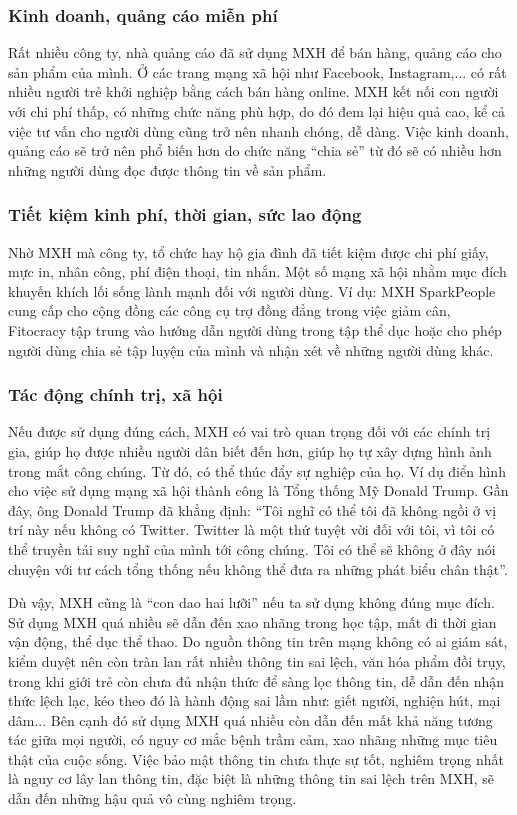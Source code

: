 		\subsubsection{Kinh doanh, quảng cáo miễn phí}
		Rất nhiều công ty, nhà quảng cáo đã sử dụng MXH để bán hàng, quảng cáo cho sản phẩm của mình. Ở các trang mạng xã hội như Facebook, Instagram,... có rất nhiều người trẻ khởi nghiệp bằng cách bán hàng online. MXH kết nối con người với chi phí thấp, có những chức năng phù hợp, do đó đem lại hiệu quả cao, kể cả việc tư vấn cho người dùng cũng trở nên nhanh chóng, dễ dàng. Việc kinh doanh, quảng cáo sẽ trở nên phổ biến hơn do chức năng “chia sẻ” từ đó sẽ có nhiều hơn những người dùng đọc được thông tin về sản phẩm.
		\subsubsection{Tiết kiệm kinh phí, thời gian, sức lao động}
		Nhờ MXH mà công ty, tổ chức hay hộ gia đình đã tiết kiệm được chi phí giấy, mực in, nhân công, phí điện thoại, tin nhắn. Một số mạng xã hội nhằm mục đích khuyến khích lối sống lành mạnh đối với người dùng. Ví dụ: MXH SparkPeople cung cấp cho cộng đồng các công cụ trợ đồng đẳng trong việc giảm cân, Fitocracy tập trung vào hướng dẫn người dùng trong tập thể dục hoặc cho phép người dùng chia sẻ tập luyện của mình và nhận xét về những người dùng khác.
		\subsubsection{Tác động chính trị, xã hội}
		Nếu được sử dụng đúng cách, MXH có vai trò quan trọng đối với các chính trị gia, giúp họ được nhiều người dân biết đến hơn, giúp họ tự xây dựng hình ảnh trong mắt công chúng. Từ đó, có thể thúc đẩy sự nghiệp của họ. Ví dụ điển hình cho việc sử dụng mạng xã hội thành công là Tổng thống Mỹ Donald Trump. Gần đây, ông Donald Trump đã khẳng định: “Tôi nghĩ có thể tôi đã không ngồi ở vị trí này nếu không có Twitter. Twitter là một thứ tuyệt vời đối với tôi, vì tôi có thể truyền tải suy nghĩ của mình tới công chúng. Tôi có thể sẽ không ở đây nói chuyện với tư cách tổng thống nếu không thể đưa ra những phát biểu chân thật”.
		
		Dù vậy, MXH cũng là “con dao hai lưỡi” nếu ta sử dụng không đúng mục đích. Sử dụng MXH quá nhiều sẽ dẫn đến xao nhãng trong học tập, mất đi thời gian vận động, thể dục thể thao. Do nguồn thông tin trên mạng không có ai giám sát, kiểm duyệt nên còn tràn lan rất nhiều thông tin sai lệch, văn hóa phẩm đồi trụy, trong khi giới trẻ còn chưa đủ nhận thức để sàng lọc thông tin, dễ dẫn đến nhận thức lệch lạc, kéo theo đó là hành động sai lầm như: giết người, nghiện hút, mại dâm... Bên cạnh đó sử dụng MXH quá nhiều còn dẫn đến mất khả năng tương tác giữa mọi người, có nguy cơ mắc bệnh trầm cảm, xao nhãng những mục tiêu thật của cuộc sống. Việc bảo mật thông tin chưa thực sự tốt, nghiêm trọng nhất là nguy cơ lây lan thông tin, đặc biệt là những thông tin sai lệch trên MXH, sẽ dẫn đến những hậu quả vô cùng nghiêm trọng.
		
